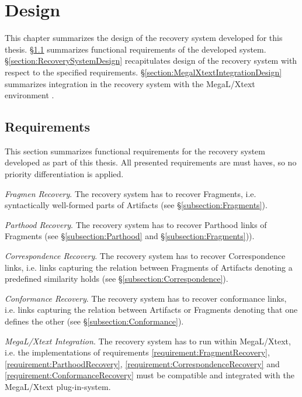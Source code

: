 \chapter{Design}
\label{chapter:Design}
This chapter summarizes the design of the recovery system developed for this thesis.
§\ref{section:Requirements} summarizes functional requirements of the developed system.
§\ref{section:RecoverySystemDesign} recapitulates design of the recovery system with respect to the specified requirements.
§\ref{section:MegalXtextIntegrationDesign} summarizes integration in the recovery system with the \gls{MegaL/Xtext} environment .

\section{Requirements}
\label{section:Requirements}
This section summarizes functional requirements for the recovery system developed as part of this thesis.
All presented requirements are must haves, so no priority differentiation is applied. 

\begin{requirements}

\item
\label{requirement:FragmentRecovery}
\textit{Fragmen Recovery}.
The recovery system has to recover \glspl{Fragment}, i.e. syntactically well-formed parts of \glspl{Artifact} (see §\ref{subsection:Fragments}).

\item
\label{requirement:ParthoodRecovery}
\textit{Parthood Recovery}.
The recovery system has to recover \gls{Parthood} links of \glspl{Fragment} (see §\ref{subsection:Parthood} and §\ref{subsection:Fragments})).

\item
\label{requirement:CorrespondenceRecovery}
\textit{Correspondence Recovery}.
The recovery system has to recover \gls{Correspondence} links, i.e. links capturing the relation between \glspl{Fragment} of \glspl{Artifact} denoting a predefined similarity holds (see §\ref{subsection:Correspondence}).

\item
\label{requirement:ConformanceRecovery} 
\textit{Conformance Recovery}.
The recovery system has to recover conformance links, i.e. links capturing the relation between \glspl{Artifact} or \glspl{Fragment} denoting that one defines the other (see §\ref{subsection:Conformance}).

\item 
\label{Requirement:Megal-Xtext}
\textit{\gls{MegaL/Xtext} Integration}.
The recovery system has to run within \gls{MegaL/Xtext}, i.e. the implementations of requirements 
\ref{requirement:FragmentRecovery},
\ref{requirement:ParthoodRecovery}, 
\ref{requirement:CorrespondenceRecovery} 
and \ref{requirement:ConformanceRecovery} must be compatible and integrated with the \gls{MegaL/Xtext} plug-in-system.

\end{requirements}

